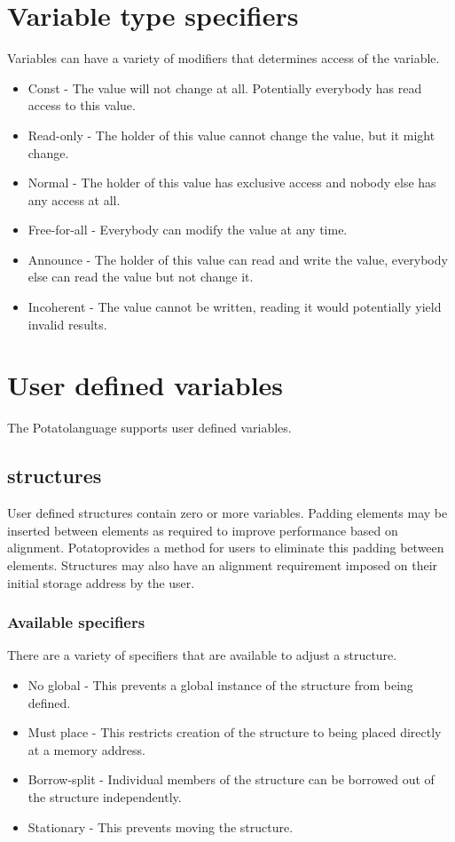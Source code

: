 \documentclass[12pt]{article}
\newcommand{\progLangNameSpace}{Potato\space }
\begin{document}
\section {Variable type specifiers}

Variables can have a variety of modifiers that determines access of the variable.
\begin {itemize}
\item Const - The value will not change at all. Potentially everybody has read access to this value.
\item Read-only - The holder of this value cannot change the value, but it might change.
\item Normal - The holder of this value has exclusive access and nobody else has any access at all.
\item Free-for-all - Everybody can modify the value at any time.
\item Announce - The holder of this value can read and write the value, everybody else can read the value but not change it.
\item Incoherent - The value cannot be written, reading it would potentially yield invalid results.
\end {itemize}

\section {User defined variables}
The \progLangNameSpace language supports user defined variables.


\subsection {structures}
User defined structures contain zero or more variables. Padding elements may be inserted between elements as required to improve performance based on alignment. \progLangNameSpace provides a method for users to eliminate this padding between elements. Structures may also have an alignment requirement imposed on their initial storage address by the user.

\subsubsection { Available specifiers }

There are a variety of specifiers that are available to adjust a structure.

\begin{itemize}
\item No global - This prevents a global instance of the structure from being defined.
\item Must place - This restricts creation of the structure to being placed directly at a memory address.
\item Borrow-split - Individual members of the structure can be borrowed out of the structure independently.
\item Stationary - This prevents moving the structure.
\end{itemize}
\end{document}
